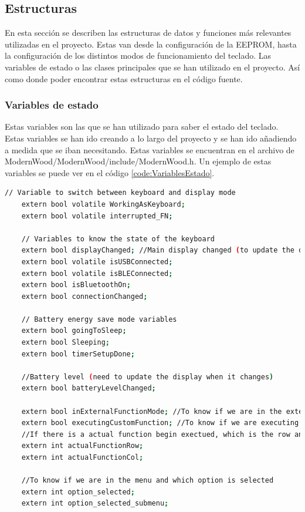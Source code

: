 \subsection{Estructuras}

En esta sección se describen las estructuras de datos y funciones más relevantes utilizadas en el proyecto. Estas van desde la configuración de la \gls{EEPROM}, hasta la configuración de los distintos modos de funcionamiento del teclado. Las variables de estado o las clases principales que se han utilizado en el proyecto. Así como donde poder encontrar estas estructuras en el código fuente.
\subsubsection{Variables de estado}

Estas variables son las que se han utilizado para saber el estado del teclado. Estas variables se han ido creando a lo largo del proyecto y se han ido añadiendo a medida que se iban necesitando. Estas variables se encuentran en el archivo de ModernWood/ModernWood/include/ModernWood.h. Un ejemplo de estas variables se puede ver en el código \ref{code:VariablesEstado}.

\begin{lstlisting}[style=console, language=bash, caption={Variables de estado del teclado}, label={code:VariablesEstado}]
    // Variable to switch between keyboard and display mode
    extern bool volatile WorkingAsKeyboard;
    extern bool volatile interrupted_FN;

    // Variables to know the state of the keyboard
    extern bool displayChanged; //Main display changed (to update the display in the main loop)
    extern bool volatile isUSBConnected;
    extern bool volatile isBLEConnected;
    extern bool isBluetoothOn;
    extern bool connectionChanged;
    
    // Battery energy save mode variables
    extern bool goingToSleep;
    extern bool Sleeping;
    extern bool timerSetupDone;

    //Battery level (need to update the display when it changes)
    extern bool batteryLevelChanged;
    
    extern bool inExternalFunctionMode; //To know if we are in the external function mode
    extern bool executingCustomFunction; //To know if we are executing a custom function
    //If there is a actual function begin exectued, which is the row and col of the key
    extern int actualFunctionRow; 
    extern int actualFunctionCol;

    //To know if we are in the menu and which option is selected
    extern int option_selected;
    extern int option_selected_submenu;

\end{lstlisting}

